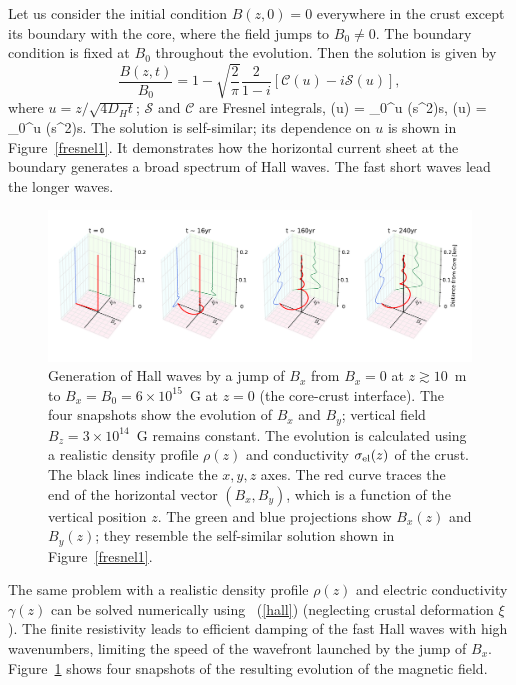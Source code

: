 Let us consider the initial condition $B(z,0)=0$ everywhere in the crust except
its boundary with the core, where the field jumps to $B_0\neq 0$. The boundary 
condition is fixed at $B_0$ throughout the evolution. Then the solution is given by
\begin{equation}\label{fre1}
  \frac{B(z,t)}{B_0} = 1-\sqrt{\frac{2}{\pi}}\frac{2}{1-i}\left[\mathcal{C}(u)-i\mathcal{S}(u)\right],
\end{equation}
where $u = z/\sqrt{4D_H t}$; $\mathcal{S}$ and $\mathcal{C}$ are Fresnel integrals,
\beq
	(u) = \int_0^u \sin(s^2)\:\md s,  \quad
	(u) = \int_0^u \cos(s^2)\:\md s.
\eeq
The solution is self-similar; its dependence on $u$ is shown in Figure~\ref{fresnel1}.
It demonstrates how the horizontal current sheet at the boundary generates a broad 
spectrum of Hall waves. The fast short waves lead the longer waves.

\begin{figure}[h]
\centering
\includegraphics[width=1.0\textwidth]{pics/chap2/hall.pdf} 
\caption[Generation of Hall waves in the magnetar crust]{
Generation of Hall waves by a jump of $B_x$ from $B_x=0$ at $z\gtrsim 10$~m to 
$B_x=B_0=6\times 10^{15}$~G at $z=0$ (the core-crust interface). The four snapshots show 
the evolution of $B_x$ and $B_y$; vertical field $B_z=3\times 10^{14}$~G remains constant. 
The evolution is calculated using a realistic density profile $\rho(z)$ and conductivity 
$\sigma_{\rm el}(z)$ of the crust. The black lines indicate the $x,y,z$ axes.  The red curve traces 
the end of the horizontal vector $(B_x,B_y)$, which is a function of the vertical position $z$.
The green and blue projections show $B_x(z)$ and $B_y(z)$; they resemble the 
self-similar solution shown in Figure~\ref{fresnel1}.
}
\label{cartoon}
\end{figure}


The same problem with a realistic density profile $\rho(z)$ and electric conductivity 
$\gamma(z)$ can be solved numerically using \Eq~(\ref{hall}) (neglecting crustal 
deformation $\xi$). The finite resistivity leads to efficient damping of the fast Hall waves with 
high wavenumbers, limiting the speed of the wavefront launched by the jump of $B_x$.
Figure~\ref{cartoon} 
shows four snapshots of the resulting evolution of the magnetic field.

